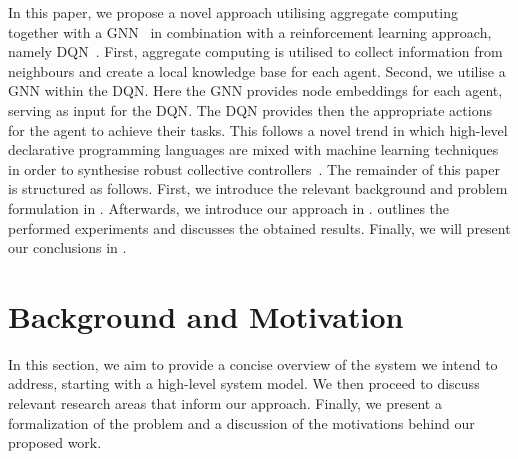 \documentclass[conference]{IEEEtran}
\begin{document}
In this paper, 
we propose a novel approach utilising aggregate computing~\cite{Beal2015Computer} together with a \ac{GNN}~\cite{Zhou2020AIOpen} in combination with a reinforcement learning approach, namely \ac{DQN}~\cite{mnih2015human}. 
 First, aggregate computing is utilised to collect information from neighbours and create a local knowledge base for each agent. Second, we utilise a \ac{GNN} within the \ac{DQN}. 
 Here the \ac{GNN} provides node embeddings for each agent, serving as input for the \ac{DQN}. 
 The \ac{DQN} provides then the appropriate actions for the agent to achieve their tasks.
%
This follows a novel trend in which high-level declarative programming languages are mixed with machine learning techniques in order to synthesise robust collective controllers~\cite{DBLP:conf/acsos/Aguzzi21,DBLP:conf/icdcs/AguzziCV22,DBLP:conf/coordination/AguzziCV22}.
The remainder of this paper is structured as follows. 
 First, we introduce the relevant background and problem formulation in . 
 Afterwards, we introduce our approach in . 
  outlines the performed experiments and discusses the obtained results. 
 Finally, we will present our conclusions in .

\section{Background and Motivation}
\label{sec:background}
In this section, we aim to provide a concise overview of the system we intend to address, 
 starting with a high-level system model. 
%
We then proceed to discuss relevant research areas that inform our approach. 
%
Finally, we present a formalization of the problem and a discussion of the motivations behind our proposed work.
\end{document}
